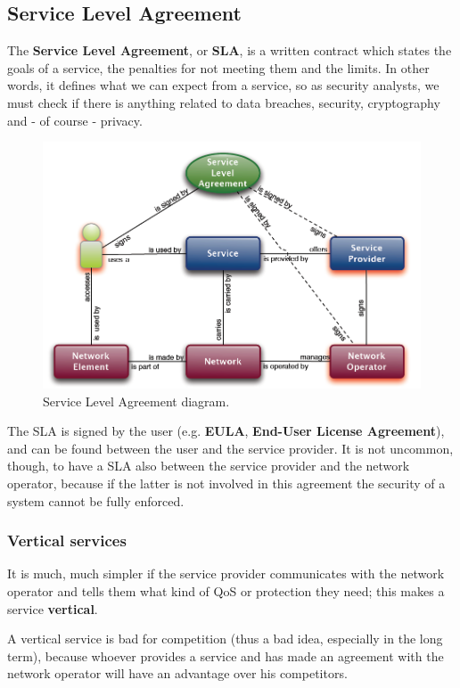 \subsection{Service Level Agreement}
The \textbf{Service Level Agreement}, or \textbf{SLA}, is a written contract which states the goals of a service, the penalties for not meeting them and the limits. In other words, it defines what we can expect from a service, so as security analysts, we must check if there is anything related to data breaches, security, cryptography and - of course - privacy.

\begin{figure}[h]
    \centering
    \includegraphics[scale=0.5]{img/sla.png}
    \decoRule
    \caption{Service Level Agreement diagram.}
    \label{fig:sla}
\end{figure}

The SLA is signed by the user (e.g. \textbf{EULA}, \textbf{End-User License Agreement}), and can be found between the user and the service provider. It is not uncommon, though, to have a SLA also between the service provider and the network operator, because if the latter is not involved in this agreement the security of a system cannot be fully enforced.

\subsubsection*{Vertical services}
It is much, much simpler if the service provider communicates with the network operator and tells them what kind of QoS or protection they need; this makes a service \textbf{vertical}.

A vertical service is bad for competition (thus a bad idea, especially in the long term), because whoever provides a service and has made an agreement with the network operator will have an advantage over his competitors.

